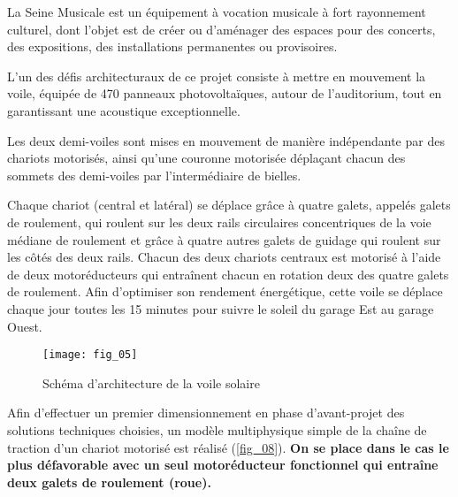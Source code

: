 \ifprof
\vspace{1cm}
\else
\begin{multicols}{2}
\fi

\setcounter{numques}{0}
\ifprof
\else
La Seine Musicale est un équipement à vocation musicale à fort rayonnement culturel, dont l’objet est de créer
ou d’aménager des espaces pour des concerts, des expositions, des installations permanentes ou provisoires.


L’un des défis architecturaux de ce projet consiste à mettre en mouvement la voile, %
équipée de 470 panneaux photovoltaïques, autour de l’auditorium, tout en garantissant une acoustique exceptionnelle.

%


Les deux demi-voiles sont mises en mouvement de manière indépendante par des chariots motorisés, ainsi qu’une couronne motorisée déplaçant chacun des sommets des demi-voiles par l’intermédiaire
de bielles. 

Chaque chariot (central et latéral) se déplace grâce à quatre galets, appelés galets de roulement, qui roulent
sur les deux rails circulaires concentriques de la voie médiane de roulement et grâce à quatre autres galets de
guidage qui roulent sur les côtés des deux rails. Chacun des deux chariots centraux est motorisé à l’aide de deux
motoréducteurs qui entraînent chacun en rotation deux des quatre galets de roulement.
Afin d’optimiser son rendement énergétique, cette voile se déplace chaque jour toutes les 15 minutes pour suivre
le soleil du garage Est au garage Ouest.%



\begin{figure}[H]
\centering
\texttt{[image: fig\_05]}
\caption{Schéma d’architecture de la voile solaire \label{fig_05}}
\end{figure}

Afin d’effectuer un premier dimensionnement en phase d’avant-projet des solutions
techniques choisies, un modèle multiphysique simple de la chaîne de traction d’un chariot motorisé est réalisé
(\autoref{fig_08}).
\textbf{On se place dans le cas le plus défavorable avec un seul motoréducteur fonctionnel qui entraîne
deux galets de roulement (roue).}



\end{multicols}

